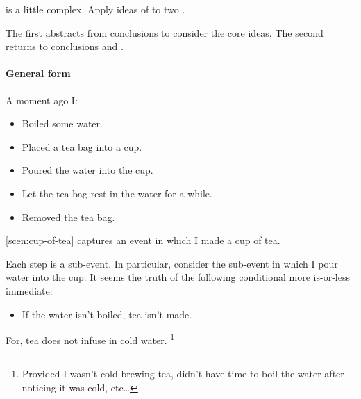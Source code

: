 \begin{note}
  \qWhyV{} is a little complex.
  Apply ideas of \qWhyV{} to two .

  The first  abstracts from conclusions to consider the core ideas.
  The second  returns to conclusions and .
\end{note}

\paragraph*{General form}

\begin{note}
  \begin{scenario}%
    \label{scen:cup-of-tea}%
    A moment ago I:
    \begin{itemize}[noitemsep]
    \item
      Boiled some water.
    \item
      Placed a tea bag into a cup.
    \item
      Poured the water into the cup.
    \item
      Let the tea bag rest in the water for a while.
    \item
      Removed the tea bag.
    \end{itemize}
    \vspace{-\baselineskip}
  \end{scenario}

  \autoref{scen:cup-of-tea} captures an event in which I made a cup of tea.

  Each step is a sub-event.
  In particular, consider the sub-event in which I pour water into the cup.
  It seems the truth of the following conditional more is-or-less immediate:
  \begin{itemize}
  \item
    If the water isn't boiled, tea isn't made.
  \end{itemize}
  For, tea does not infuse in cold water.%
  \footnote{
    Provided I wasn't cold-brewing tea, didn't have time to boil the water after noticing it was cold, etc\dots
  }
\end{note}

